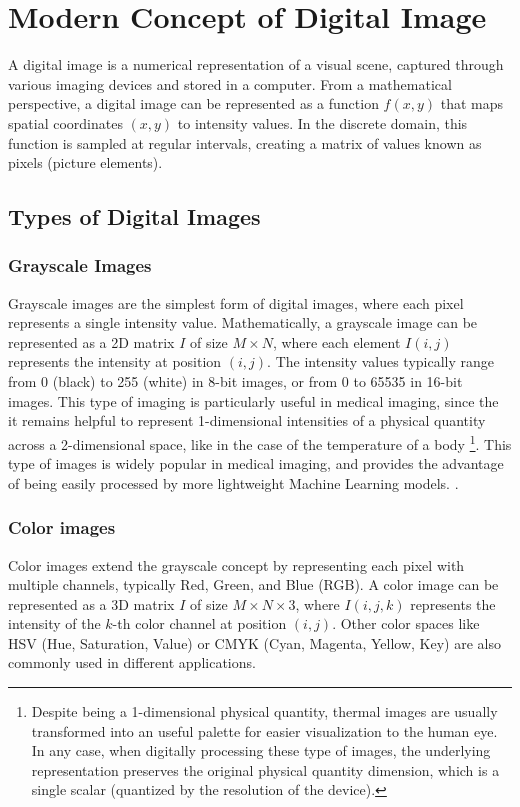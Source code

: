 \section{Modern Concept of Digital Image}

A digital image is a numerical representation of a visual scene,
captured through various imaging devices and stored in a computer.
From a mathematical perspective, a digital image can be represented
as a function $f(x,y)$ that maps spatial coordinates $(x,y)$ to
intensity values. In the discrete domain, this function is sampled at
regular intervals, creating a matrix of values known as pixels
(picture elements).

\subsection{Types of Digital Images}

\subsubsection{Grayscale Images}
Grayscale images are the simplest form of digital images, where each
pixel represents a single intensity value. Mathematically, a
grayscale image can be represented as a 2D matrix $I$ of size $M
\times N$, where each element $I(i,j)$ represents the intensity at
position $(i,j)$. The intensity values typically range from 0 (black)
to 255 (white) in 8-bit images, or from 0 to 65535 in 16-bit images.
This type of imaging is particularly useful in medical imaging,
since the it remains helpful to represent 1-dimensional intensities
of a physical quantity across a 2-dimensional space, like in the case
of the temperature of a body \footnote{Despite being a 1-dimensional
  physical quantity, thermal images are usually transformed into an
  useful palette for easier visualization to the human eye. In any case,
  when digitally processing these type of  images, the underlying
  representation preserves the original physical quantity dimension,
  which is a single scalar (quantized by the resolution of the
device).}. This type of images is widely popular in medical imaging,
and provides the advantage of being easily processed by more
lightweight Machine Learning models. \cite{XieEtAl2018}.

\subsubsection{Color images}
Color images extend the grayscale concept by representing each pixel
with multiple channels, typically Red, Green, and Blue (RGB). A color
image can be represented as a 3D matrix $I$ of size $M \times N
\times 3$, where $I(i,j,k)$ represents the intensity of the $k$-th
color channel at position $(i,j)$. Other color spaces like HSV (Hue,
Saturation, Value) or CMYK (Cyan, Magenta, Yellow, Key) are also
commonly used in different applications.


